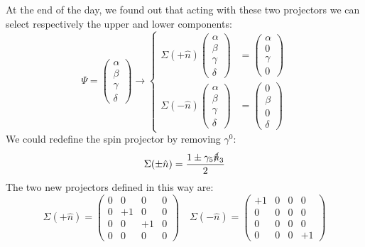 \documentclass[../main.tex]{subfiles}
\begin{document}
At the end of the day, we found out that acting with these two projectors we can select respectively the upper and lower components:
\[
\Psi=\left(\begin{array}{c}
     \alpha \\
     \beta \\
     \gamma \\
     \delta
\end{array}\right)
\xrightarrow[]{}
\left\{
\begin{aligned}
\Sigma(+\hat{n})\left(\begin{array}{c}
     \alpha \\
     \beta \\
     \gamma \\
     \delta
\end{array}\right)&=\left(\begin{array}{c}
     \alpha \\
     0 \\
     \gamma \\
     0
\end{array}\right)\\
\Sigma(-\hat{n})\left(\begin{array}{c}
     \alpha \\
     \beta \\
     \gamma \\
     \delta
\end{array}\right)&=\left(\begin{array}{c}
     0 \\
     \beta \\
     0 \\
     \delta
\end{array}\right)
\end{aligned}
\right.
\]
We could redefine the spin projector by removing $\gamma^0$:
\[
\Sigma(\pm\hat{n})=\frac{1\pm\gamma_5\slashed{\hat{n}}_3}{2}
\]
The two new projectors defined in this way are:
\[
\Sigma(+\hat{n})=\begin{pmatrix}
0 & 0 & 0 & 0 \\
0 & +1 & 0 & 0 \\
0 & 0 & +1 & 0 \\
0 & 0 & 0 & 0
\end{pmatrix} \quad \Sigma(-\hat{n})=\begin{pmatrix}
+1 & 0 & 0 & 0 \\
0 & 0 & 0 & 0 \\
0 & 0 & 0 & 0 \\
0 & 0 & 0 & +1
\end{pmatrix}
\]
\end{document}
